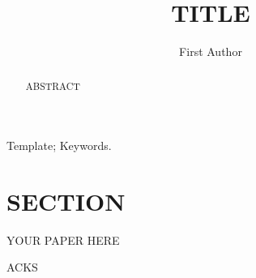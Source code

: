 \documentclass{jot}
\title{TITLE}
\author[affiliation=orgname, nowrap] %
    {First Author}
    {is ...
    Contact him at \email{EMAIL}, or visit \url{URL}.}
\affiliation{orgname}{ORGANISATION}
\begin{document}
\begin{abstract}
ABSTRACT
\end{abstract}

\keywords
Template; Keywords.


\section{SECTION}

YOUR PAPER HERE


\backmatter




\abouttheauthors

\begin{acknowledgments}
ACKS
\end{acknowledgments}
\end{document}
